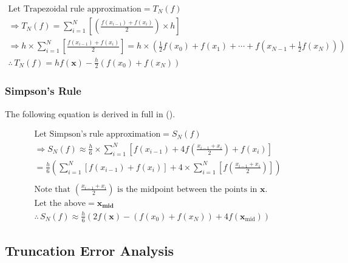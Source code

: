 \documentclass[10pt]{article}
\begin{document}
        \begin{gather*}
            \text{Let Trapezoidal rule approximation} = T_N(f) \\
            \Rightarrow T_N(f)
            = \sum_{i=1}^{N} \left[ \left( \frac{f(x_{i-1}) + f(x_i)}{2} \right) \times h \right] \\
            \Rightarrow h \times \sum_{i=1}^N \left[ \frac{f(x_{i-1}) + f(x_i)}{2} \right]
            = h \times \left( \frac{1}{2}f(x_0) + f(x_1) + \cdots + f(x_{N-1} + \frac{1}{2}f(x_N))\right) \\
            \therefore \, T_N(f) = hf(\boldsymbol{x}) - \frac{h}{2}(f(x_0) + f(x_N))
        \end{gather*}
        
        

        \pagebreak[4]
        \subsubsection{Simpson's Rule}

        The following equation is derived in full in (\cite{Florescu2019}).

        \begin{gather*}
            \text{Let Simpson's rule approximation} = S_N(f) \\
            \Rightarrow S_N(f) \approx \frac{h}{6} \times \sum_{i=1}^N \left[ f(x_{i-1}) + 4f \left( \frac{x_{i-1} + x_i}{2} \right) + f(x_i) \right] \\
            = \frac{h}{6} \left( \sum_{i=1}^N [f(x_{i-1}) + f(x_i)] + 4 \times \sum_{i=1}^N \left[ f \left( \frac{x_{i-1} + x_i}{2} \right) \right] \right) \\
            \\
            \text{Note that $\left( \frac{x_{i-1} + x_i}{2} \right)$ is the midpoint between the points in $\boldsymbol{x}$.} \\
            \text{Let the above} = \boldsymbol{x_\text{mid}} \\
            \therefore \, S_N(f) \approx \frac{h}{6} \left( 2f(\boldsymbol{x}) - (f(x_0) + f(x_N)) + 4f(\boldsymbol{x}_\text{mid}) \right)
        \end{gather*}

        
    
    \pagebreak[3]
    \subsection{Truncation Error Analysis} \label{section:q3:trunc_error}
\end{document}
